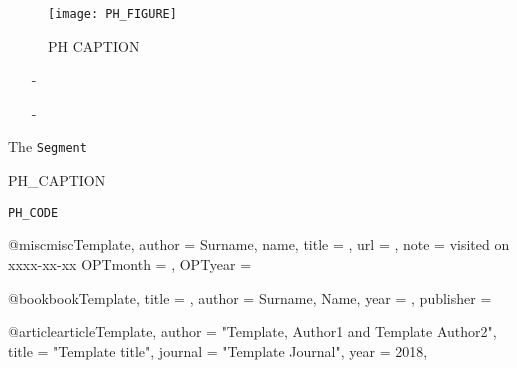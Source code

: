 \begin{figure}[H]
	\centering
	\texttt{[image: PH\_FIGURE]}
	\caption{PH CAPTION}
	\label{fig:PH_LABEL}
\end{figure}

\begin{itemize}\label{stuff}
	\item[-] 
\end{itemize}

\begin{enumerate}
	\item [-]
\end{enumerate}

The \texttt{Segment}

\begin{listing}[H]
	\caption{PH_CAPTION}
	\label{listing:PH_LABEL}
	\begin{verbatim}
PH_CODE
	\end{verbatim}
\end{listing}

@misc{miscTemplate,
	author = {Surname, name},
	title = {},
	url = {},
	note = {visited on xxxx-xx-xx}
	OPTmonth = {},
	OPTyear = {}
}

@book{bookTemplate,
	title = {},
	author = {Surname, Name},
	year = {},
	publisher = {}
}

@article{articleTemplate,
  author  = "Template, Author1 and Template Author2",
  title   = "Template title",
  journal = "Template Journal",
  year    = 2018,
}
